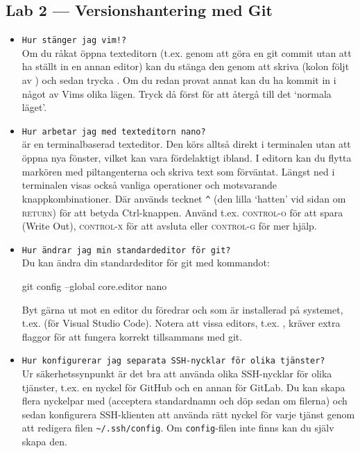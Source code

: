 \documentclass[fleqn, article, a4paper]{memoir}
\newcommand{\file}[1]{\texttt{#1}}
\newcommand{\commandchar}[1]{\textsc{#1}}
\begin{document}
\subsection{Lab 2 --- Versionshantering med Git}
\begin{itemize}
    \item \texttt{Hur stänger jag vim!?}\\
          Om du råkat öppna texteditorn  (t.ex. genom att göra en git commit utan att ha ställt in en annan editor) kan du stänga den genom att skriva  (kolon följt av ) och sedan trycka . Om du redan provat annat kan du ha kommit in i något av Vims olika lägen. Tryck då först  för att återgå till det \enquote*{normala läget}.

    \item \texttt{Hur arbetar jag med texteditorn nano?} \\
           är en terminalbaserad texteditor. Den körs alltså direkt i terminalen utan att öppna nya fönster, vilket kan vara fördelaktigt ibland. I editorn kan du flytta markören med piltangenterna och skriva text som förväntat. Längst ned i terminalen visas också vanliga operationer och motsvarande knappkombinationer. Där används tecknet \texttt{\^{}} (den lilla \enquote*{hatten} vid sidan om \commandchar{return}) för att betyda Ctrl-knappen. Använd t.ex. \commandchar{control-o} för att spara (Write Out), \commandchar{control-x} för att avsluta eller \commandchar{control-g} för mer hjälp.

    \item \texttt{Hur ändrar jag min standardeditor för git?}\\
          Du kan ändra din standardeditor för git med kommandot:
          \begin{Code}
              git config --global core.editor nano
          \end{Code}
          Byt gärna ut  mot en editor du föredrar och som är installerad på systemet, t.ex.  (för Visual Studio Code). Notera att vissa editors, t.ex. , kräver extra flaggor för att fungera korrekt tillsammans med git.

    \item \texttt{Hur konfigurerar jag separata SSH-nycklar för olika tjänster?}\\
          Ur säkerhetssynpunkt är det bra att använda olika SSH-nycklar för olika tjänster, t.ex. en nyckel för GitHub och en annan för GitLab. Du kan skapa flera nyckelpar med  (acceptera standardnamn och döp sedan om filerna) och sedan konfigurera SSH-klienten att använda rätt nyckel för varje tjänst genom att redigera filen \file{\textasciitilde/.ssh/config}. Om \file{config}-filen inte finns kan du själv skapa den.


\end{itemize}
\end{document}
